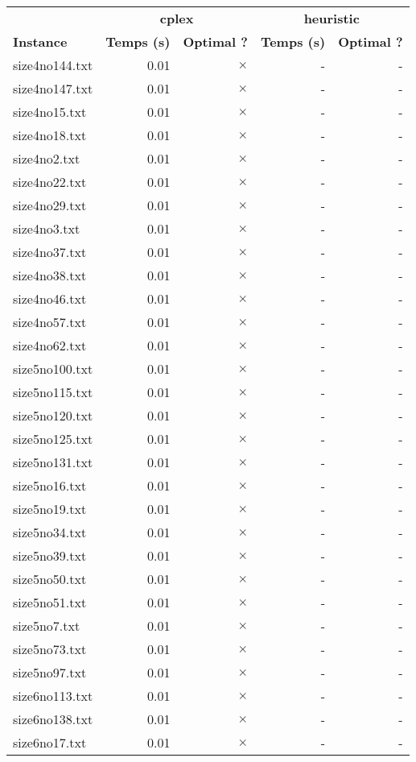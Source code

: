 \documentclass{article}
\begin{document}
\newpage
\begin{center}
\renewcommand{\arraystretch}{1.4} 
 \begin{tabular}{lrrrr}
	\hline
 & \multicolumn{2}{c}{\textbf{cplex}} & \multicolumn{2}{c}{\textbf{heuristic}}\\
\textbf{Instance}  & \textbf{Temps (s)} & \textbf{Optimal ?}  & \textbf{Temps (s)} & \textbf{Optimal ?} \\\hline

size4no144.txt & 0.01 & 
$\times$
 & - & - 
\\
size4no147.txt & 0.01 & 
$\times$
 & - & - 
\\
size4no15.txt & 0.01 & 
$\times$
 & - & - 
\\
size4no18.txt & 0.01 & 
$\times$
 & - & - 
\\
size4no2.txt & 0.01 & 
$\times$
 & - & - 
\\
size4no22.txt & 0.01 & 
$\times$
 & - & - 
\\
size4no29.txt & 0.01 & 
$\times$
 & - & - 
\\
size4no3.txt & 0.01 & 
$\times$
 & - & - 
\\
size4no37.txt & 0.01 & 
$\times$
 & - & - 
\\
size4no38.txt & 0.01 & 
$\times$
 & - & - 
\\
size4no46.txt & 0.01 & 
$\times$
 & - & - 
\\
size4no57.txt & 0.01 & 
$\times$
 & - & - 
\\
size4no62.txt & 0.01 & 
$\times$
 & - & - 
\\
size5no100.txt & 0.01 & 
$\times$
 & - & - 
\\
size5no115.txt & 0.01 & 
$\times$
 & - & - 
\\
size5no120.txt & 0.01 & 
$\times$
 & - & - 
\\
size5no125.txt & 0.01 & 
$\times$
 & - & - 
\\
size5no131.txt & 0.01 & 
$\times$
 & - & - 
\\
size5no16.txt & 0.01 & 
$\times$
 & - & - 
\\
size5no19.txt & 0.01 & 
$\times$
 & - & - 
\\
size5no34.txt & 0.01 & 
$\times$
 & - & - 
\\
size5no39.txt & 0.01 & 
$\times$
 & - & - 
\\
size5no50.txt & 0.01 & 
$\times$
 & - & - 
\\
size5no51.txt & 0.01 & 
$\times$
 & - & - 
\\
size5no7.txt & 0.01 & 
$\times$
 & - & - 
\\
size5no73.txt & 0.01 & 
$\times$
 & - & - 
\\
size5no97.txt & 0.01 & 
$\times$
 & - & - 
\\
size6no113.txt & 0.01 & 
$\times$
 & - & - 
\\
size6no138.txt & 0.01 & 
$\times$
 & - & - 
\\
size6no17.txt & 0.01 & 
$\times$
 & - & - 
\\
\hline\end{tabular}
\end{center}
\end{document}

